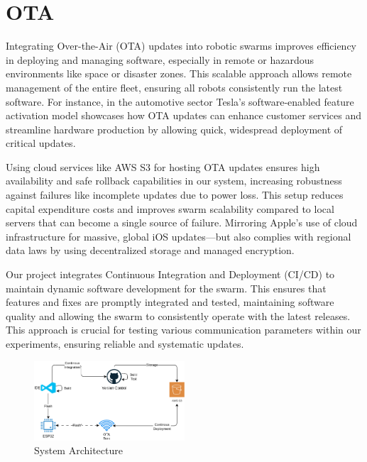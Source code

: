 \documentclass{report}
\begin{document}
\section{OTA}


Integrating Over-the-Air (OTA) updates into robotic swarms improves efficiency in deploying and managing software, especially in remote or hazardous environments like space or disaster zones. This scalable approach allows remote management of the entire fleet, ensuring all robots consistently run the latest software. For instance, in the automotive sector Tesla's software-enabled feature activation model showcases how OTA updates can enhance customer services and streamline hardware production by allowing quick, widespread deployment of critical updates.

Using cloud services like AWS S3 for hosting OTA updates ensures high availability and safe rollback capabilities in our system, increasing robustness against failures like incomplete updates due to power loss. This setup reduces capital expenditure costs and improves swarm scalability compared to local servers that can become a single source of failure. Mirroring Apple’s use of cloud infrastructure for massive, global iOS updates—but also complies with regional data laws by using decentralized storage and managed encryption.

Our project integrates Continuous Integration and Deployment (CI/CD) to maintain dynamic software development for the swarm. This ensures that features and fixes are promptly integrated and tested, maintaining software quality and allowing the swarm to consistently operate with the latest releases. This approach is crucial for testing various communication parameters within our experiments, ensuring reliable and systematic updates.

\begin{figure}[h]
    \centering
    \includegraphics[width=0.5\textwidth]{architecture.png}
    \caption{System Architecture}
    \label{fig:architecture}
\end{figure}
\end{document}
